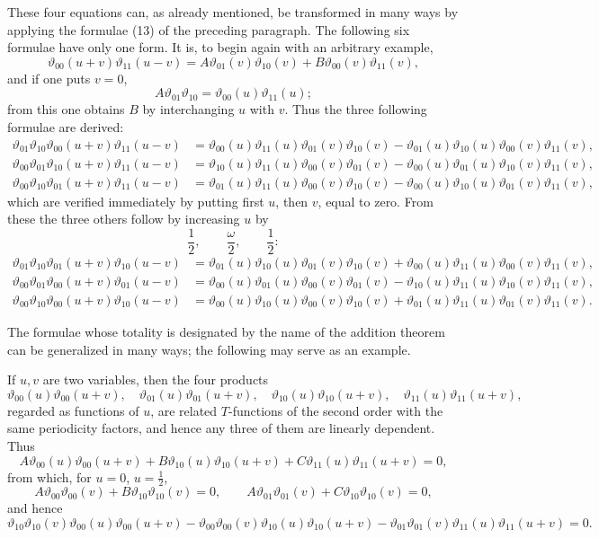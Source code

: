 \documentclass[11pt]{article}
\providecommand{\tht}{\vartheta}
\begin{document}
These four equations can, as already mentioned, be transformed in many ways by applying the formulae (13) of the preceding paragraph. The following six formulae have only one form. It is, to begin again with an arbitrary example,
\[
\tht_{00}(u+v)\tht_{11}(u-v)=A\tht_{01}(v)\tht_{10}(v)+B\tht_{00}(v)\tht_{11}(v),
\]
and if one puts $v=0$,
\[
A\tht_{01}\tht_{10}=\tht_{00}(u)\tht_{11}(u);
\]
from this one obtains $B$ by interchanging $u$ with $v$. Thus the three following formulae are derived:
\begin{align}
\tht_{01}\tht_{10}\tht_{00}(u+v)\tht_{11}(u-v)
&=\tht_{00}(u)\tht_{11}(u)\tht_{01}(v)\tht_{10}(v)
 -\tht_{01}(u)\tht_{10}(u)\tht_{00}(v)\tht_{11}(v), \tag{5}\\
\tht_{00}\tht_{01}\tht_{10}(u+v)\tht_{11}(u-v)
&=\tht_{10}(u)\tht_{11}(u)\tht_{00}(v)\tht_{01}(v)
 -\tht_{00}(u)\tht_{01}(u)\tht_{10}(v)\tht_{11}(v), \tag{6}\\
\tht_{00}\tht_{10}\tht_{01}(u+v)\tht_{11}(u-v)
&=\tht_{01}(u)\tht_{11}(u)\tht_{00}(v)\tht_{10}(v)
 -\tht_{00}(u)\tht_{10}(u)\tht_{01}(v)\tht_{11}(v), \tag{7}
\end{align}
which are verified immediately by putting first $u$, then $v$, equal to zero. From these the three others follow by increasing $u$ by
\[
\frac12,\qquad \frac{\omega}{2},\qquad \frac12:
\]
\begin{align}
\tht_{01}\tht_{10}\tht_{01}(u+v)\tht_{10}(u-v)
&=\tht_{01}(u)\tht_{10}(u)\tht_{01}(v)\tht_{10}(v)
 +\tht_{00}(u)\tht_{11}(u)\tht_{00}(v)\tht_{11}(v), \tag{8}\\
\tht_{00}\tht_{01}\tht_{00}(u+v)\tht_{01}(u-v)
&=\tht_{00}(u)\tht_{01}(u)\tht_{00}(v)\tht_{01}(v)
 -\tht_{10}(u)\tht_{11}(u)\tht_{10}(v)\tht_{11}(v), \tag{9}\\
\tht_{00}\tht_{10}\tht_{00}(u+v)\tht_{10}(u-v)
&=\tht_{00}(u)\tht_{10}(u)\tht_{00}(v)\tht_{10}(v)
 +\tht_{01}(u)\tht_{11}(u)\tht_{01}(v)\tht_{11}(v). \tag{10}
\end{align}

The formulae whose totality is designated by the name of the addition theorem can be generalized in many ways; the following may serve as an example.

If $u,v$ are two variables, then the four products
\[
\tht_{00}(u)\tht_{00}(u+v),\quad
\tht_{01}(u)\tht_{01}(u+v),\quad
\tht_{10}(u)\tht_{10}(u+v),\quad
\tht_{11}(u)\tht_{11}(u+v),
\]
regarded as functions of $u$, are related $T$-functions of the second order with the same periodicity factors, and hence any three of them are linearly dependent. Thus
\[
A\tht_{00}(u)\tht_{00}(u+v)+B\tht_{10}(u)\tht_{10}(u+v)+C\tht_{11}(u)\tht_{11}(u+v)=0,
\]
from which, for $u=0$, $u=\frac12$,
\[
A\tht_{00}\tht_{00}(v)+B\tht_{10}\tht_{10}(v)=0,
\qquad
A\tht_{01}\tht_{01}(v)+C\tht_{10}\tht_{10}(v)=0,
\]
and hence
\begin{equation}
\tht_{10}\tht_{10}(v)\tht_{00}(u)\tht_{00}(u+v)
-\tht_{00}\tht_{00}(v)\tht_{10}(u)\tht_{10}(u+v)
-\tht_{01}\tht_{01}(v)\tht_{11}(u)\tht_{11}(u+v)=0.
\tag{11}
\end{equation}
\end{document}
